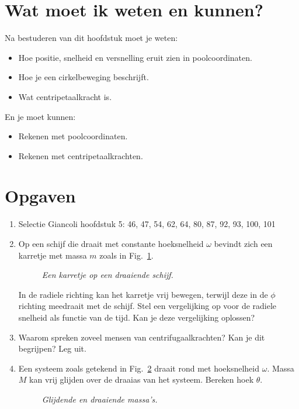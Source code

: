 \section{Wat moet ik weten en kunnen?}

Na bestuderen van dit hoofdstuk moet je weten:
\begin{itemize}
\item Hoe positie, snelheid en versnelling eruit zien in poolcoordinaten.
\item Hoe je een cirkelbeweging beschrijft.
\item Wat centripetaalkracht is.
\end{itemize}
En je moet kunnen:
\begin{itemize}
\item Rekenen met poolcoordinaten.
\item Rekenen met centripetaalkrachten.
\end{itemize}

\section{Opgaven}

\begin{enumerate}
\item Selectie Giancoli hoofdstuk 5:  46, 47, 54, 62, 64, 80, 87, 92, 93, 100, 101
\item Op een schijf die draait met constante hoeksnelheid $\omega$ bevindt zich 
een karretje met massa $m$ zoals in Fig.~\ref{fig:BalInBuis}. 
 \begin{figure}[htbp]
\begin{center}
\caption{{\it Een karretje op een draaiende schijf.}}
\label{fig:BalInBuis}
\end{center}
\end{figure} 
In de radiele richting 
kan het  karretje vrij bewegen, terwijl deze in de $\phi$ richting meedraait met de schijf.
Stel een vergelijking op voor de radiele snelheid als functie van de tijd. Kan je deze
vergelijking oplossen?
\item Waarom spreken zoveel mensen van centrifugaalkrachten? Kan je dit begrijpen? 
Leg uit.
\item Een systeem zoals getekend in Fig.~\ref{fig:flyball} draait rond met hoeksnelheid
$\omega$. Massa $M$ kan vrij glijden over de draaias van het systeem. Bereken
hoek $\theta$.
 \begin{figure}[htbp]
\begin{center}
\caption{{\it Glijdende en draaiende massa's.}}
\label{fig:flyball}
\end{center}
\end{figure} 

\end{enumerate}


